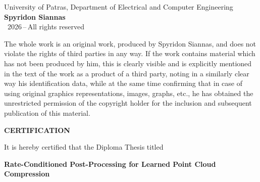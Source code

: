 \cleardoublepage
\thispagestyle{empty}
\vspace*{3cm}

\begin{center}
  {\normalsize University of Patras, Department of Electrical and Computer Engineering}\\[0.5em]
  {\large\bfseries Spyridon Siannas}\\[0.5em]
  {\normalsize \textcopyright\ 2026\,--\,All rights reserved}
\end{center}

\vspace{2em}

\noindent The whole work is an original work, produced by Spyridon Siannas, and does not
violate the rights of third parties in any way.
If the work contains material which has not been produced by him, this is clearly visible
and is explicitly mentioned in the text of the work as a product of a third party, noting
in a similarly clear way his identification data, while at the same time confirming that
in case of using original graphics representations, images, graphs, etc., he has obtained
the unrestricted permission of the copyright holder for the inclusion and subsequent
publication of this material.

\cleardoublepage
\thispagestyle{empty}
\vspace*{1.5cm}

\begin{center}
  {\large\bfseries CERTIFICATION}
\end{center}

\vspace{0.8em}

\begin{center}
  It is hereby certified that the Diploma Thesis titled
\end{center}

\vspace{0.5em}

\begin{center}
  {\bfseries Rate-Conditioned Post-Processing for Learned Point Cloud Compression}
\end{center}

\vspace{0.5em}


